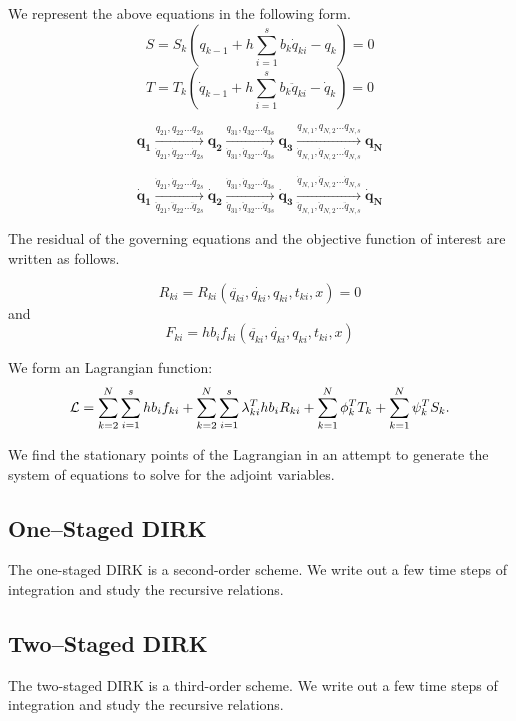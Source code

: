 \documentclass[10pt,letter]{book}
\begin{document}
     We represent the above equations in the following form.
     $$ S = S_k(q_{k-1} + h \sum_{i=1}^s b_k \dot{q}_{ki} - q_{k})  = 0$$
     $$ T = T_k(\dot{q}_{k-1} + h \sum_{i=1}^s b_k \ddot{q}_{ki} - \dot{q}_{k}) = 0$$
     

     $$\mathbf{q_1} \xrightarrow[\dot{q}_{21},\dot{q}_{22}\ldots\dot{q}_{2s}]{q_{21},q_{22}\ldots q_{2s}} \mathbf{q_2} \xrightarrow[\dot{q}_{31},\dot{q}_{32}\ldots\dot{q}_{3s}]{q_{31},q_{32}\ldots q_{3s}} \mathbf{q_3} \xrightarrow[\dot{q}_{N,1},\dot{q}_{N,2}\ldots\dot{q}_{N,s}]{q_{N,1},q_{N,2}\ldots q_{N,s}} \mathbf{q_N}$$

     $$\mathbf{\dot{q}_1} \xrightarrow[\ddot{q}_{21},\ddot{q}_{22}\ldots\ddot{q}_{2s}]{\dot{q}_{21},\dot{q}_{22}\ldots \dot{q}_{2s}} \mathbf{\dot{q}_2} \xrightarrow[\ddot{q}_{31},\ddot{q}_{32}\ldots\ddot{q}_{3s}]{\dot{q}_{31},\dot{q}_{32}\ldots \dot{q}_{3s}} \mathbf{\dot{q}_3} \xrightarrow[\ddot{q}_{N,1},\ddot{q}_{N,2}\ldots\ddot{q}_{N,s}]{\dot{q}_{N,1},\dot{q}_{N,2}\ldots \dot{q}_{N,s}} \mathbf{\dot{q}_N}$$

     The residual of the governing equations and the objective
     function of interest are written as follows.

     $$R_{ki} = R_{ki}(\ddot{q_{ki}},\dot{q_{ki}},q_{ki},t_{ki}, x)=0$$
     and 
     $$F_{ki} =  h b_i f_{ki}(\ddot{q_{ki}},\dot{q_{ki}},q_{ki},t_{ki}, x)$$

     We form an Lagrangian function:
     $$ {\cal{L}} = \sum_{k=2}^{N} \sum_{i=1}^s h b_i f_{ki} +
     \sum_{k=2}^{N} \sum_{i=1}^s\lambda_{ki}^T h b_i R_{ki} +
     \sum_{k=1}^N \phi_k^T T_k + \sum_{k=1}^N \psi_k^T S_k. $$

     We find the stationary points of the Lagrangian in an attempt to
     generate the system of equations to solve for the adjoint variables.

     \subsection{One--Staged DIRK}
     The one-staged DIRK is a second-order scheme. We write out a few
     time steps of integration and study the recursive relations.

     \subsection{Two--Staged DIRK}
     The two-staged DIRK is a third-order scheme. We write out a few
     time steps of integration and study the recursive relations.
\end{document}
